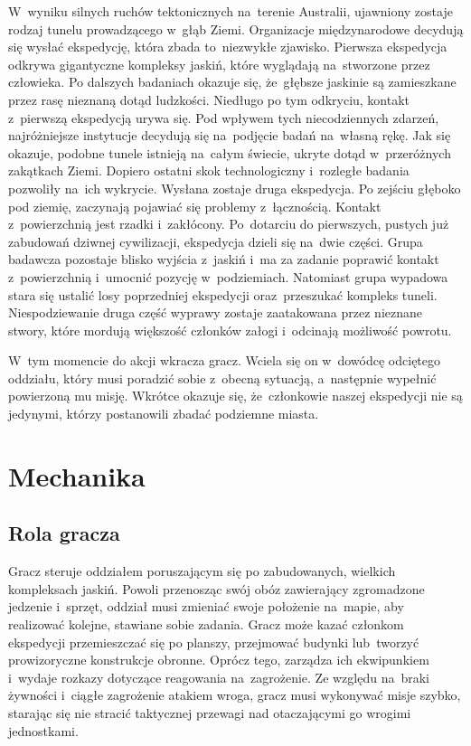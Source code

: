 \documentclass[licencjacka]{pracamgr}
\begin{document}
    W~wyniku silnych ruchów tektonicznych na~terenie Australii, ujawniony zostaje rodzaj tunelu
    prowadzącego w~głąb Ziemi. Organizacje międzynarodowe decydują się wysłać ekspedycję, która zbada to~niezwykłe
    zjawisko. Pierwsza ekspedycja odkrywa gigantyczne kompleksy jaskiń, które wyglądają na~stworzone przez człowieka.
    Po dalszych badaniach okazuje się, że~głębsze jaskinie są zamieszkane przez rasę nieznaną dotąd ludzkości. Niedługo
    po tym odkryciu, kontakt z~pierwszą ekspedycją urywa się. Pod wpływem tych niecodziennych zdarzeń, najróżniejsze
    instytucje decydują się na~podjęcie badań na~własną rękę. Jak się okazuje, podobne tunele istnieją na~całym świecie,
    ukryte dotąd w~przeróżnych zakątkach Ziemi. Dopiero ostatni skok technologiczny i~rozległe badania pozwoliły na~ich 
    wykrycie. Wysłana zostaje druga ekspedycja. Po zejściu głęboko pod ziemię, zaczynają pojawiać się problemy z~łącznością.
    Kontakt z~powierzchnią jest rzadki i~zakłócony. Po~dotarciu do pierwszych, pustych już zabudowań dziwnej cywilizacji,
    ekspedycja dzieli się na~dwie części. Grupa badawcza pozostaje blisko wyjścia z~jaskiń i~ma za zadanie poprawić
    kontakt z~powierzchnią i~umocnić pozycję w~podziemiach. Natomiast grupa wypadowa stara się ustalić losy poprzedniej
    ekspedycji oraz~przeszukać kompleks tuneli. Niespodziewanie druga część wyprawy zostaje zaatakowana przez nieznane stwory,
    które mordują większość członków załogi i~odcinają możliwość powrotu.

    W~tym momencie do akcji wkracza gracz. Wciela się on w~dowódcę odciętego oddziału, który musi poradzić sobie z~obecną
    sytuacją, a~następnie wypełnić powierzoną mu misję. Wkrótce okazuje się, że~członkowie naszej ekspedycji nie są jedynymi,
    którzy postanowili zbadać podziemne miasta.

  \section{Mechanika}
    \subsection{Rola gracza}
      Gracz steruje oddziałem poruszającym się po zabudowanych, wielkich kompleksach jaskiń. Powoli przenosząc swój obóz zawierający
      zgromadzone jedzenie i~sprzęt, oddział musi zmieniać swoje położenie na~mapie, aby realizować kolejne, stawiane sobie zadania.
      Gracz może kazać członkom ekspedycji przemieszczać się po planszy, przejmować budynki lub~tworzyć prowizoryczne konstrukcje obronne.
      Oprócz tego, zarządza ich ekwipunkiem i~wydaje rozkazy dotyczące reagowania na~zagrożenie. Ze względu na~braki żywności
      i~ciągłe zagrożenie atakiem wroga, gracz musi wykonywać misje szybko, starając się nie stracić taktycznej przewagi nad
      otaczającymi go wrogimi jednostkami.
\end{document}
